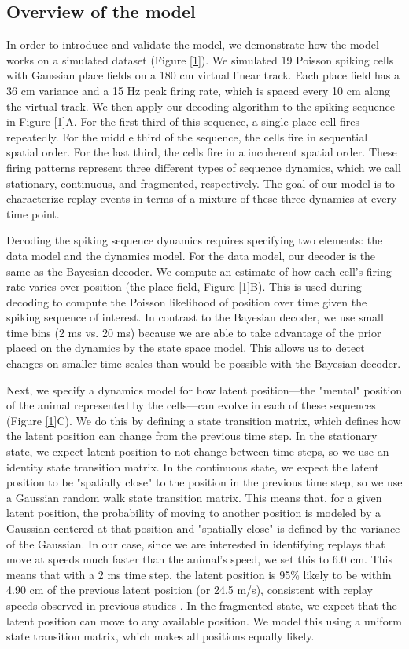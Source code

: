 \documentclass[times, twoside]{zHenriquesLab-StyleBioRxiv}
\begin{document}
\subsection*{Overview of the model}
In order to introduce and validate the model, we demonstrate how the model works on a simulated dataset (Figure \ref{1}). We simulated 19 Poisson spiking cells with Gaussian place fields on a 180 cm virtual linear track. Each place field has a 36 cm variance and a 15 Hz peak firing rate, which is spaced every 10 cm along the virtual track. We then apply our decoding algorithm to the spiking sequence in Figure \ref{1}A. For the first third of this sequence, a single place cell fires repeatedly. For the middle third of the sequence, the cells fire in sequential spatial order. For the last third, the cells fire in a incoherent spatial order. These firing patterns represent three different types of sequence dynamics, which we call stationary, continuous, and fragmented, respectively. The goal of our model is to characterize replay events in terms of a mixture of these three dynamics at every time point.

Decoding the spiking sequence dynamics requires specifying two elements: the data model and the dynamics model. For the data model, our decoder is the same as the Bayesian decoder. We compute an estimate of how each cell's firing rate varies over position (the place field, Figure \ref{1}B). This is used during decoding to compute the Poisson likelihood of position over time given the spiking sequence of interest. In contrast to the Bayesian decoder, we use small time bins (2 ms vs. 20 ms) because we are able to take advantage of the prior placed on the dynamics by the state space model. This allows us to detect changes on smaller time scales than would be possible with the Bayesian decoder.

Next, we specify a dynamics model for how latent position---the "mental" position of the animal represented by the cells---can evolve in each of these sequences (Figure \ref{1}C). We do this by defining a state transition matrix, which defines how the latent position can change from the previous time step. In the stationary state, we expect latent position to not change between time steps, so we use an identity state transition matrix. In the continuous state, we expect the latent position to be "spatially close" to the position in the previous time step, so we use a Gaussian random walk state transition matrix. This means that, for a given latent position, the probability of moving to another position is modeled by a Gaussian centered at that position and "spatially close" is defined by the variance of the Gaussian. In our case, since we are interested in identifying replays that move at speeds much faster than the animal's speed, we set this to 6.0 cm. This means that with a 2 ms time step, the latent position is 95\% likely to be within 4.90 cm of the previous latent position (or 24.5 m/s), consistent with replay speeds observed in previous studies \cite{DavidsonHippocampalReplayExtended2009, PfeifferAutoassociativedynamicsgeneration2015}. In the fragmented state, we expect that the latent position can move to any available position. We model this using a uniform state transition matrix, which makes all positions equally likely.
\end{document}
